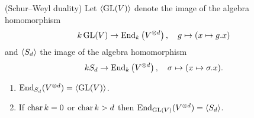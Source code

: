 \begin{theorem}(Schur--Weyl duality)
  Let $\left\langle \operatorname{GL}(V) \right\rangle$ denote the image of the algebra homomorphism
  \[
            k \operatorname{GL}(V)
    \to     \operatorname{End}_k\left( V^{\otimes d} \right),
    \quad   g
    \mapsto (x \mapsto g.x)
  \]
  and $\left\langle S_d \right\rangle$ the image of the algebra homomorphism
  \[
            k S_d
    \to     \operatorname{End}_k\left( V^{\otimes d} \right),
    \quad   \sigma
    \mapsto (x \mapsto \sigma.x).
  \]
  \begin{enumerate}[label=\emph{(\alph*)}, leftmargin=*]
    \item \label{enum: end sd = gl}
      $\operatorname{End}_{S_d}(V^{\otimes d}) = \left\langle \operatorname{GL}(V) \right\rangle$.
    \item \label{enum: end gl = sd}
      If $\operatorname{char} k = 0$ or $\operatorname{char} k > d$ then $\operatorname{End}_{\operatorname{GL}(V)}(V^{\otimes d}) = \left\langle S_d \right\rangle$.
  \end{enumerate}
\end{theorem}
